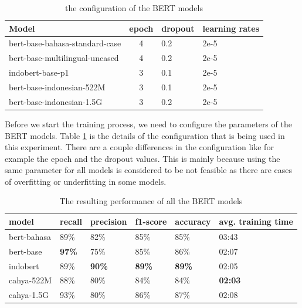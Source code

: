 \begin{table}[h]
  \centering
  \caption{the configuration of the BERT models}
  \label{tab:multi_bert_config}
  \begin{tabular}{|p{.5\linewidth}|c|l|p{.12\linewidth} |}
    \hline
    Model                          & epoch & dropout & learning rates \\ \hline
    bert-base-bahasa-standard-case & 4     & 0.2     & 2e-5           \\ \hline
    bert-base-multilingual-uncased & 4     & 0.2     & 2e-5           \\ \hline
    indobert-base-p1               & 3     & 0.1     & 2e-5           \\ \hline
    bert-base-indonesian-522M      & 3     & 0.1     & 2e-5           \\ \hline
    bert-base-indonesian-1.5G      & 3     & 0.2     & 2e-5           \\ \hline
  \end{tabular}
\end{table}

Before we start the training process, we need to configure the parameters of the BERT models. Table \ref{tab:multi_bert_config} is the details of the configuration that is being used in this experiment. There are a couple differences in the configuration like for example the epoch and the dropout values. This is mainly because using the same parameter for all models is considered to be not feasible as there are cases of overfitting or underfitting in some models.

\begin{table}[h]
  \centering
  \caption{The resulting performance of all the BERT models}
  \label{tab:model_bert_result}
  \begin{tabular}{|l|l|l|l|l|p{.12\linewidth}|}
    \hline
    \textbf{model} & \textbf{recall} & \textbf{precision} & \textbf{f1-score} & \textbf{accuracy} & \textbf{avg. training time} \\ \hline
    bert-bahasa    & 89\%            & 82\%               & 85\%              & 85\%              & 03:43                       \\ \hline
    bert-base      & \textbf{97\%}   & 75\%               & 85\%              & 86\%              & 02:07                       \\ \hline
    indobert       & 89\%            & \textbf{90\%}      & \textbf{89\%}     & \textbf{89\%}     & 02:05                       \\ \hline
    cahya-522M     & 88\%            & 80\%               & 84\%              & 84\%              & \textbf{02:03}              \\ \hline
    cahya-1.5G     & 93\%            & 80\%               & 86\%              & 87\%              & 02:08                       \\ \hline
  \end{tabular}
\end{table}

